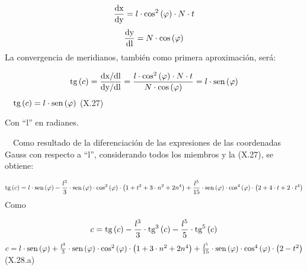 \documentclass{tufte-book}
\newcommand\normalsubformula[1]{\text{\mathversion{normal}$#1$}}
\begin{document}
\begin{equation*}
{\frac{\normalsubformula{\text{dx}}}{\normalsubformula{\text{dy}}}=l\cdot
\text{cos}^{{2}}\left(\varphi \right)\cdot N\cdot t}
\end{equation*}
\begin{equation*}
{\frac{\normalsubformula{\text{dy}}}{\normalsubformula{\text{dl}}}=N\cdot
\text{cos}\left(\varphi \right)}
\end{equation*}
La convergencia de meridianos, también como primera aproximación,
será:

\begin{equation*}
{\normalsubformula{\text{tg}}\left(c\right)=\frac{\normalsubformula{\text{dx}}/\normalsubformula{\text{dl}}}{\normalsubformula{\text{dy}}/\normalsubformula{\text{dl}}}=\frac{l\cdot
\text{cos}^{{2}}\left(\varphi \right)\cdot N\cdot t}{N\cdot
\text{cos}\left(\varphi \right)}=l\cdot
\normalsubformula{\text{sen}}\left(\varphi \right)}
\end{equation*}
\ \  ${\normalsubformula{\text{tg}}\left(c\right)=l\cdot
\normalsubformula{\text{sen}}\left(\varphi \right)}$  (X.27)

Con {\textquotedblleft}l{\textquotedblright} en radianes.

\ \ Como resultado de la diferenciación de las expresiones de las
coordenadas Gauss con respecto a
{\textquotedblleft}l{\textquotedblright}, considerando todos los
miembros y la (X.27), se obtiene:

\begin{equation*}
{\normalsubformula{\text{tg}}\left(c\right)=l\cdot
\normalsubformula{\text{sen}}\left(\varphi
\right)-\frac{l^{{3}}}{3}\cdot
\normalsubformula{\text{sen}}\left(\varphi \right)\cdot
\text{cos}^{{2}}\left(\varphi \right)\cdot \left(1+t^{{2}}+3\cdot
n^{{2}}+2n^{{4}}\right)+\frac{l^{{5}}}{\text{15}}\cdot
\normalsubformula{\text{sen}}\left(\varphi \right)\cdot
\text{cos}^{{4}}\left(\varphi \right)\cdot \left(2+4\cdot t+2\cdot
t^{{4}}\right)}
\end{equation*}
Como

\begin{equation*}
{c=\normalsubformula{\text{tg}}\left(c\right)-\frac{l^{{3}}}{3}\cdot
\normalsubformula{\text{tg}}^{{3}}\left(c\right)-\frac{l^{{5}}}{5}\cdot
\normalsubformula{\text{tg}}^{{5}}\left(c\right)}
\end{equation*}
 ${c=l\cdot \normalsubformula{\text{sen}}\left(\varphi
\right)+\frac{l^{{3}}}{3}\cdot
\normalsubformula{\text{sen}}\left(\varphi \right)\cdot
\text{cos}^{{2}}\left(\varphi \right)\cdot \left(1+3\cdot
n^{{2}}+2n^{{4}}\right)+\frac{l^{{5}}}{\text{15}}\cdot
\normalsubformula{\text{sen}}\left(\varphi \right)\cdot
\text{cos}^{{4}}\left(\varphi \right)\cdot \left(2-t^{{2}}\right)}$ 
(X.28.a)
\end{document}
